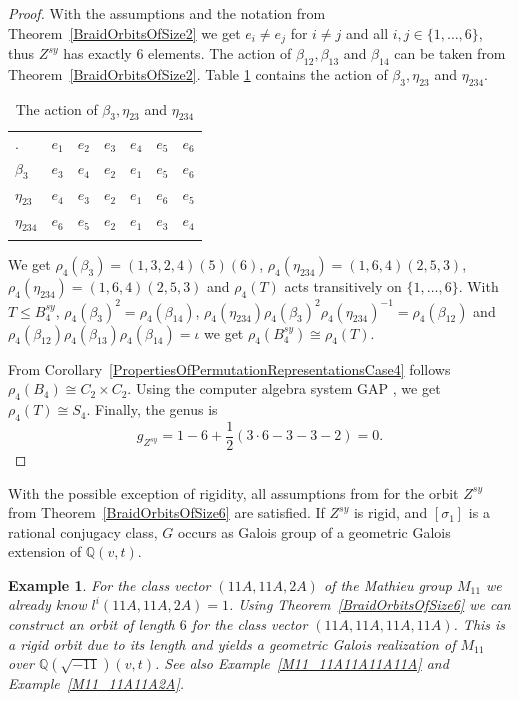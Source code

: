 \documentclass[12pt,a4paper]{article}
\newtheorem{example}{Example}[section]
\numberwithin{equation}{section}
\numberwithin{table}{section}
\begin{document}
\begin{proof}
With the assumptions and the notation from Theorem~\ref{BraidOrbitsOfSize2} we get $e_i \neq e_j$
for $i \neq j$ and all $i,j \in \{ 1,\dots,6 \}$, thus $Z^{sy}$ has exactly $6$ elements.
The action of $\beta_{12}, \beta_{13}$ and $\beta_{14}$ can be taken from Theorem~\ref{BraidOrbitsOfSize2}.
Table \ref{tab:ActionBeta3Eta23Eta234} contains the action of $\beta_3, \eta_{23}$ and $\eta_{234}$.
%
\begin{table}[!htbp]
\centering
\footnotesize
\captionsetup{font=footnotesize}
\caption{The action of $\beta_3, \eta_{23}$ and $\eta_{234}$}
\label{tab:ActionBeta3Eta23Eta234}
\begin{tabular}{lllllll}
\hline\noalign{\smallskip}
. & $e_1$ & $e_2$ & $e_3$ & $e_4$ & $e_5$ & $e_6$ \\
\noalign{\smallskip}\hline\noalign{\smallskip}
$\beta_3$    & $e_3$ & $e_4$ & $e_2$ & $e_1$ & $e_5$ & $e_6$ \\
$\eta_{23}$  & $e_4$ & $e_3$ & $e_2$ & $e_1$ & $e_6$ & $e_5$ \\
$\eta_{234}$ & $e_6$ & $e_5$ & $e_2$ & $e_1$ & $e_3$ & $e_4$ \\
\noalign{\smallskip}\hline
\end{tabular}
\end{table}
%
We get $\rho_4(\beta_3)=(1,3,2,4)(5)(6)$, $\rho_4(\eta_{234})=(1,6,4)(2,5,3)$, $\rho_4(\eta_{234})=(1,6,4)(2,5,3)$
and $\rho_4(T)$ acts transitively on $\{ 1,\dots,6 \}$.
With $T \leq B^{sy}_4$,
$\rho_4(\beta_3)^2 = \rho_4(\beta_{14})$,
$\rho_4(\eta_{234}) \rho_4(\beta_3)^2 \rho_4(\eta_{234})^{-1} = \rho_4(\beta_{12})$ and
$\rho_4(\beta_{12}) \rho_4(\beta_{13}) \rho_4(\beta_{14}) = \iota$ 
we get $\rho_4(B^{sy}_4) \cong \rho_4(T)$.
\par
\noindent
From Corollary~\ref{PropertiesOfPermutationRepresentationsCase4} follows $\rho_4(B_4) \cong C_2 \times C_2$.
Using the computer algebra system GAP \cite{RefGAP}, we get $\rho_4(T) \cong S_4$.
Finally, the genus is $$g_{Z^{sy}} = 1 - 6 + \frac{1}{2}(3\cdot 6 - 3 -3 -2) = 0.$$
\end{proof}
%
\noindent
With the possible exception of rigidity, all assumptions from \cite[III, Theorem 7.10]{RefMM2018}
for the orbit $Z^{sy}$ from Theorem~\ref{BraidOrbitsOfSize6} are satisfied. If $Z^{sy}$ is rigid,
and $[\sigma_1]$ is a rational conjugacy class, $G$ occurs as Galois group of a geometric Galois
extension of $\mathbb{Q}(v,t)$.
%
\begin{example}
\label{M11_11A11A11A11ASymmetric}
For the class vector $(11A,11A,2A)$ of the Mathieu group $M_{11}$ we already know $l^i(11A,11A,2A)=1$.
Using Theorem~\ref{BraidOrbitsOfSize6} we can construct an orbit of length $6$ for the
class vector $(11A,11A,11A,11A)$. This is a rigid orbit due to its length and
yields a geometric Galois realization of $M_{11}$ over $\mathbb{Q}(\sqrt{-11})(v,t)$.
See also Example~\ref{M11_11A11A11A11A} and Example~\ref{M11_11A11A2A}.
\end{example}
\end{document}
